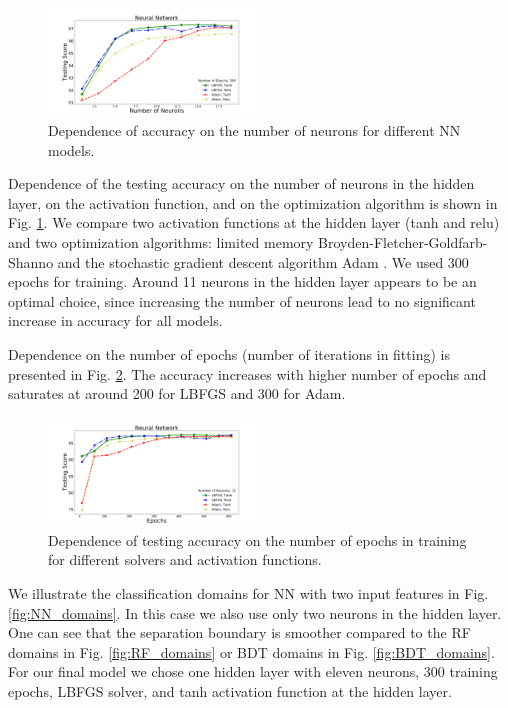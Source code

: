 \documentclass[referee]{aa} %
\begin{document}
\begin{figure}[h]
\centering
\includegraphics[width=0.5\textwidth]{plots/nn_train_neurons_assocnewfeat.pdf}
\caption{Dependence of accuracy on the number of neurons for different NN models.}
\label{fig:NN_neurons}
\end{figure}

Dependence of the testing accuracy on the number of neurons in the hidden layer, on the activation function, 
and on the optimization algorithm is shown in Fig. \ref{fig:NN_neurons}. 
We compare two activation functions at the hidden layer (tanh and relu) and two optimization algorithms: 
limited memory Broyden-Fletcher-Goldfarb-Shanno \citep[LBFGS;][]{lbfgs} 
and the stochastic gradient descent algorithm Adam \citep{2014arXiv1412.6980K}.
We used 300 epochs for training.
Around 11 neurons in the hidden layer appears to be an optimal choice, since increasing the number of neurons lead to no significant increase in accuracy for all models. 

Dependence on the number of epochs (number of iterations in fitting) is presented in Fig. \ref{fig:NN_epochs}. 
The accuracy increases with higher number of epochs and saturates at around 200 for LBFGS and 300 for Adam. 




\begin{figure}[h]
\centering
\includegraphics[width=0.5\textwidth]{plots/nn_train_epochs_assocnewfeat.pdf}
\caption{
Dependence of testing accuracy on the number of epochs in training for different solvers and activation functions.
}
\label{fig:NN_epochs}
\end{figure}
 
We illustrate the classification domains for NN with two input features in Fig. \ref{fig:NN_domains}. 
In this case we also use only two neurons in the hidden layer.
One can see that the separation boundary is smoother compared to the RF domains in Fig. \ref{fig:RF_domains} or BDT domains in Fig. \ref{fig:BDT_domains}.
For our final model we chose one hidden layer with eleven neurons, 300 training epochs, LBFGS solver, and tanh activation function at the hidden layer.
\end{document}
